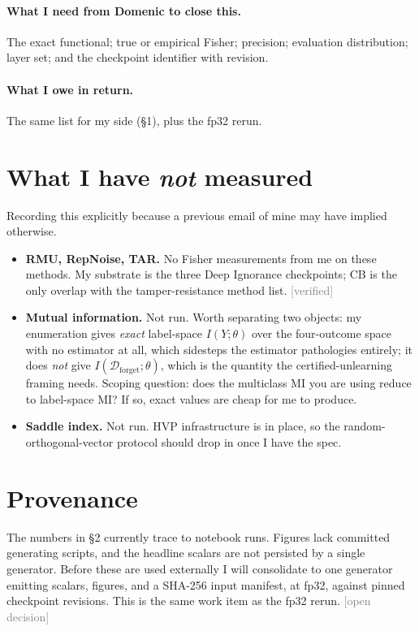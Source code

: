 \documentclass[11pt]{article}
\newcommand{\status}[1]{\textcolor{gray}{\footnotesize\textsf{[#1]}}}
\newcommand{\verified}{\status{verified}}
\newcommand{\open}{\status{open decision}}
\begin{document}
\paragraph{What I need from Domenic to close this.} The exact functional; true
or empirical Fisher; precision; evaluation distribution; layer set; and the
checkpoint identifier with revision. \paragraph{What I owe in return.} The same
list for my side (\S1), plus the fp32 rerun.

\section{What I have \emph{not} measured}

Recording this explicitly because a previous email of mine may have implied
otherwise.

\begin{itemize}[leftmargin=*]
  \item \textbf{RMU, RepNoise, TAR.} No Fisher measurements from me on these
        methods. My substrate is the three Deep Ignorance checkpoints; CB is
        the only overlap with the tamper-resistance method list. \verified{}
  \item \textbf{Mutual information.} Not run. Worth separating two objects: my
        enumeration gives \emph{exact} label-space $I(Y; \theta)$ over the
        four-outcome space with no estimator at all, which sidesteps the
        estimator pathologies entirely; it does \emph{not} give
        $I(\mathcal{D}_{\mathrm{forget}}; \theta)$, which is the quantity the
        certified-unlearning framing needs. Scoping question: does the
        multiclass MI you are using reduce to label-space MI? If so, exact
        values are cheap for me to produce.
  \item \textbf{Saddle index.} Not run. HVP infrastructure is in place, so the
        random-orthogonal-vector protocol should drop in once I have the spec.
\end{itemize}

\section{Provenance}

The numbers in \S2 currently trace to notebook runs. Figures lack committed
generating scripts, and the headline scalars are not persisted by a single
generator. Before these are used externally I will consolidate to one generator
emitting scalars, figures, and a SHA-256 input manifest, at fp32, against
pinned checkpoint revisions. This is the same work item as the fp32 rerun.
\open{}
\end{document}
